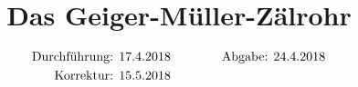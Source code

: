 

\subject{V703}
\title{Das Geiger-Müller-Zälrohr}

\date{
  \begin{align}
    \text{Durchführung: } & \text{17.4.2018} & \hspace{3em} & \text{Abgabe: 24.4.2018} \notag
\\  \text{Korrektur: } & \text{15.5.2018} & \hspace {3em} & \notag
  \end{align}
}




\maketitle
\thispagestyle{empty}
\tableofcontents
\newpage






\nocite{*}
\printbibliography{}


